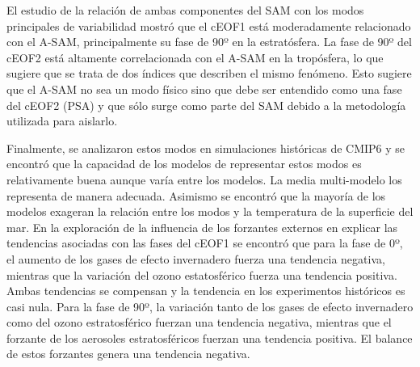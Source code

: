 \documentclass[12pt,oneside,a4paper]{reedthesis}
\begin{document}
\begin{resumen}
    El estudio de la relación de ambas componentes del SAM con los modos principales de variabilidad mostró que el cEOF1 está moderadamente relacionado con el A-SAM, principalmente su fase de 90º en la estratósfera.
    La fase de 90º del cEOF2 está altamente correlacionada con el A-SAM en la tropósfera, lo que sugiere que se trata de dos índices que describen el mismo fenómeno.
    Esto sugiere que el A-SAM no sea un modo físico sino que debe ser entendido como una fase del cEOF2 (PSA) y que sólo surge como parte del SAM debido a la metodología utilizada para aislarlo.

    Finalmente, se analizaron estos modos en simulaciones históricas de CMIP6 y se encontró que la capacidad de los modelos de representar estos modos es relativamente buena aunque varía entre los modelos.
    La media multi-modelo los representa de manera adecuada.
    Asimismo se encontró que la mayoría de los modelos exageran la relación entre los modos y la temperatura de la superficie del mar.
    En la exploración de la influencia de los forzantes externos en explicar las tendencias asociadas con las fases del cEOF1 se encontró que para la fase de 0º, el aumento de los gases de efecto invernadero fuerza una tendencia negativa, mientras que la variación del ozono estatosférico fuerza una tendencia positiva. Ambas tendencias se compensan y la tendencia en los experimentos históricos es casi nula.
    Para la fase de 90º, la variación tanto de los gases de efecto invernadero como del ozono estratosférico fuerzan una tendencia negativa, mientras que el forzante de los aerosoles estratosféricos fuerzan una tendencia positiva.
    El balance de estos forzantes genera una tendencia negativa.
  \end{resumen}
\end{document}
